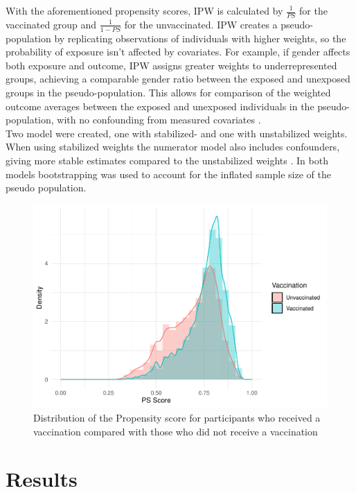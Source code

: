 \documentclass[
]{article}
\begin{document}
With the aforementioned propensity scores, IPW is calculated by \(\frac{1}{PS}\) for the vaccinated group and \(\frac{1}{1-PS}\) for the unvaccinated. IPW creates a pseudo-population by replicating observations of individuals with higher weights, so the probability of exposure isn't affected by covariates. For example, if gender affects both exposure and outcome, IPW assigns greater weights to underrepresented groups, achieving a comparable gender ratio between the exposed and unexposed groups in the pseudo-population. This allows for comparison of the weighted outcome averages between the exposed and unexposed individuals in the pseudo-population, with no confounding from measured covariates \citep{shiba}.\\
Two model were created, one with stabilized- and one with unstabilized weights. When using stabilized weights the numerator model also includes confounders, giving more stable estimates compared to the unstabilized weights \citep{ipw}. In both models bootstrapping was used to account for the inflated sample size of the pseudo population.

\begin{figure}
\includegraphics[width=0.7\linewidth]{Assignment_files/figure-latex/psscore-1} \caption{Distribution of the Propensity score for participants who received a vaccination compared with those who did not receive a vaccination}\label{fig:psscore}
\end{figure}

\hypertarget{results}{%
\section{Results}\label{results}}
\end{document}
